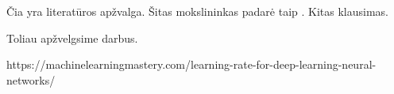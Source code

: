 Čia yra literatūros apžvalga. Šitas mokslininkas padarė taip \cite{horvath2016}.
%
Kitas klausimas.

Toliau apžvelgsime \cite{ezhov1969} darbus.

https://machinelearningmastery.com/learning-rate-for-deep-learning-neural-networks/
